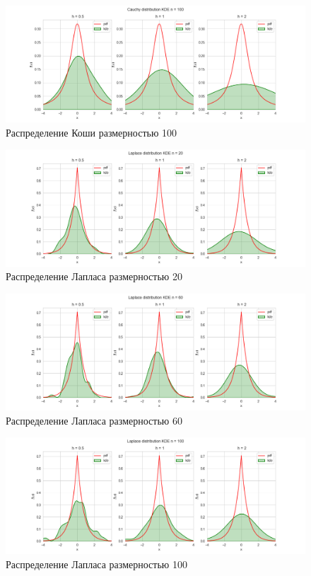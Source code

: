 \documentclass[a4paper,14pt]{article}
\begin{document}
	\begin{figure}[H]
		\centering
		\includegraphics[scale=0.48]{./lab1_4/pictures/Cauchy distributionKDE100.png}
		\caption{Распределение Коши размерностью 100}
	\end{figure}
	
	\begin{figure}[H]
		\centering
		\includegraphics[scale=0.48]{./lab1_4/pictures/Laplace distributionKDE20.png}
		\caption{Распределение Лапласа размерностью 20}
	\end{figure}
	
	\begin{figure}[H]
		\centering
		\includegraphics[scale=0.48]{./lab1_4/pictures/Laplace distributionKDE60.png}
		\caption{Распределение Лапласа размерностью 60}
	\end{figure}
	
	\begin{figure}[H]
		\centering
		\includegraphics[scale=0.48]{./lab1_4/pictures/Laplace distributionKDE100.png}
		\caption{Распределение Лапласа размерностью 100}
	\end{figure}
	
\end{document}
